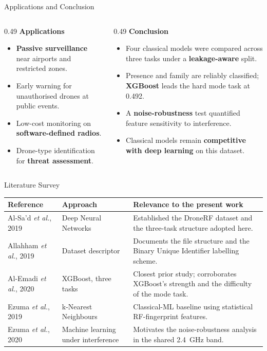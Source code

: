 \documentclass[aspectratio=169,11pt]{beamer}
\begin{document}
\begin{frame}{Applications and Conclusion}
\begin{columns}[t]
\begin{column}{0.49\textwidth}
\textbf{Applications}
\begin{itemize}\footnotesize
\item \textbf{Passive surveillance} near airports and restricted zones.
\item Early warning for unauthorised drones at public events.
\item Low-cost monitoring on \textbf{software-defined radios}.
\item Drone-type identification for \textbf{threat assessment}.
\end{itemize}
\end{column}
\begin{column}{0.49\textwidth}
\textbf{Conclusion}
\begin{itemize}\footnotesize
\item Four classical models were compared across three tasks under a
\textbf{leakage-aware} split.
\item Presence and family are reliably classified; \textbf{XGBoost} leads the
hard mode task at 0.492.
\item A \textbf{noise-robustness} test quantified feature sensitivity to
interference.
\item Classical models remain \textbf{competitive with deep learning} on this
dataset.
\end{itemize}
\end{column}
\end{columns}
\end{frame}

\begin{frame}{Literature Survey}
\scriptsize
\begin{tabular}{|p{3.0cm}|p{2.9cm}|p{5.6cm}|}
\hline
\textbf{Reference} & \textbf{Approach} & \textbf{Relevance to the present work} \\
\hline
Al-Sa'd \textit{et al.}, 2019 & Deep Neural Networks &
Established the DroneRF dataset and the three-task structure adopted here. \\
\hline
Allahham \textit{et al.}, 2019 & Dataset descriptor &
Documents the file structure and the Binary Unique Identifier labelling scheme. \\
\hline
Al-Emadi \textit{et al.}, 2020 & XGBoost, three tasks &
Closest prior study; corroborates XGBoost's strength and the difficulty of the
mode task. \\
\hline
Ezuma \textit{et al.}, 2019 & k-Nearest Neighbours &
Classical-ML baseline using statistical RF-fingerprint features. \\
\hline
Ezuma \textit{et al.}, 2020 & Machine learning under interference &
Motivates the noise-robustness analysis in the shared 2.4~GHz band. \\
\hline
\end{tabular}
\end{frame}
\end{document}
